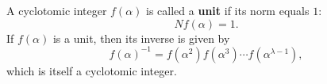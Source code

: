 A cyclotomic integer $f(\alpha)$ is called a \textbf{unit} if its norm equals $1$:
$$Nf(\alpha) = 1.$$
If $f(\alpha)$ is a unit, then its inverse is given by
$$f(\alpha)^{-1} = f(\alpha^2)f(\alpha^3)\cdots f(\alpha^{\lambda-1}),$$
which is itself a cyclotomic integer.
